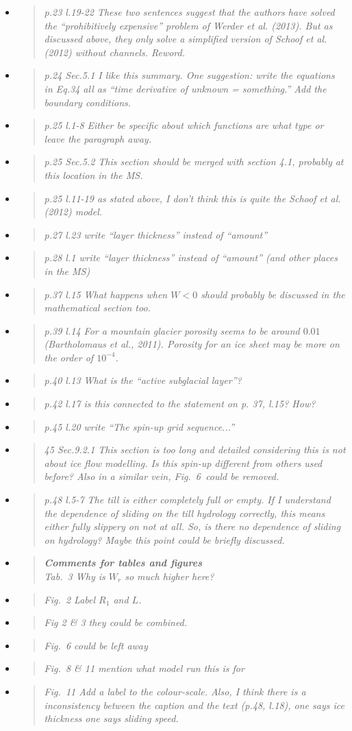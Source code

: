 \documentclass[11pt,reqno]{amsart}
\newcommand{\reply}[2]{
\medskip\medskip
\item  \begin{quote}
\emph{#1}
\end{quote}

\medskip
\noindent #2}
\begin{document}
\begin{itemize}
\reply{p.23 l.19-22 These two sentences suggest that the authors have solved the ``prohibitively expensive'' problem of Werder et al. (2013).  But as discussed above, they only solve a simplified version of Schoof et al. (2012) without channels.  Reword.}
{}

\reply{p.24 Sec.5.1 I like this summary. One suggestion: write the equations in Eq.34 all as
``time derivative of unknown = something.'' Add the boundary conditions.}
{}

\reply{p.25 l.1-8 Either be specific about which functions are what type or leave the paragraph away.}
{}

\reply{p.25 Sec.5.2 This section should be merged with section 4.1, probably at this location in the MS.}
{}

\reply{p.25 l.11-19 as stated above, I don’t think this is quite the Schoof et al. (2012) model.}
{}

\reply{p.27 l.23 write ``layer thickness'' instead of ``amount''}
{}

\reply{p.28 l.1 write ``layer thickness'' instead of ``amount'' (and other places in the MS)}
{}

\reply{p.37 l.15 What happens when $W < 0$ should probably be discussed in the mathematical section too.}
{}

\reply{p.39 l.14 For a mountain glacier porosity seems to be around $0.01$ (Bartholomaus
et al., 2011).  Porosity for an ice sheet may be more on the order of $10^{-4}$.}
{}

\reply{p.40 l.13 What is the ``active subglacial layer''?}
{}

\reply{p.42 l.17 is this connected to the statement on p. 37, l.15? How?}
{}

\reply{p.45 l.20 write ``The spin-up grid sequence...''}
{}

\reply{45 Sec.9.2.1 This section is too long and detailed considering this is not about ice flow modelling.  Is this spin-up different from others used before?  Also in a similar
vein, Fig.~6~could be removed.}
{}

\reply{p.48 l.5-7 The till is either completely full or empty.  If I understand the dependence of sliding on the till hydrology correctly, this means either fully slippery on not at all.
So, is there no dependence of sliding on hydrology?  Maybe this point could be
briefly discussed.}
{}

\reply{\textbf{Comments for tables and figures}\\
Tab.~3 Why is $W_r$ so much higher here?}
{}

\reply{Fig.~2 Label $R_1$ and $L$.}
{}

\reply{Fig 2 \& 3 they could be combined.}
{}

\reply{Fig.~6 could be left away}
{}

\reply{Fig.~8 \& 11 mention what model run this is for}
{}

\reply{Fig.~11 Add a label to the colour-scale. Also, I think there is a inconsistency between
the caption and the text (p.48, l.18), one says ice thickness one says sliding
speed.}
{}
\end{itemize}
\end{document}
